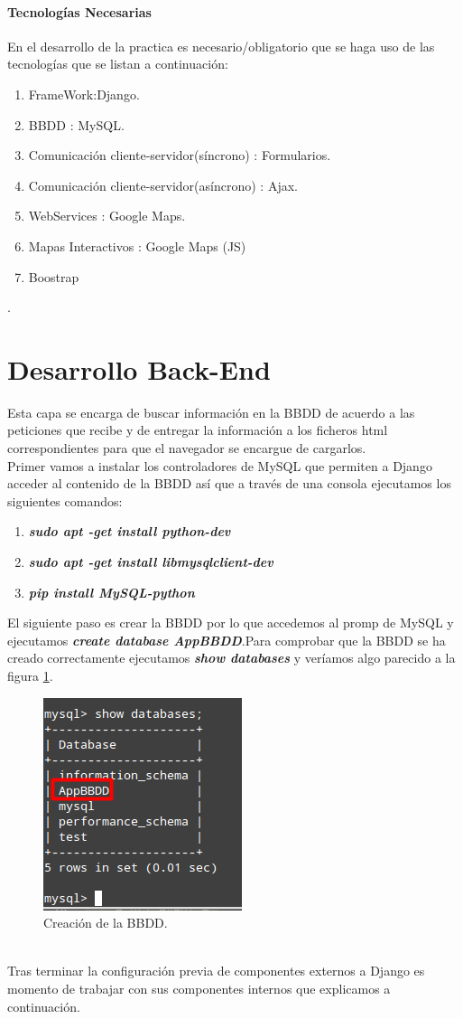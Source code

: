 \paragraph{Tecnologías Necesarias}
En el desarrollo de la practica es necesario/obligatorio que se haga uso de las tecnologías que se listan a continuación:
\begin{enumerate}
\item FrameWork:Django.
\item BBDD : MySQL.
\item Comunicación cliente-servidor(síncrono) : Formularios.
\item Comunicación cliente-servidor(asíncrono) : Ajax.
\item WebServices : Google Maps.
\item Mapas Interactivos : Google Maps (JS)
\item Boostrap
\end{enumerate}.
\section{Desarrollo Back-End}
Esta capa se encarga de buscar información en la BBDD de acuerdo a las peticiones que recibe y de entregar la información a los ficheros html correspondientes para que el navegador se encargue de cargarlos.
\\Primer vamos a instalar los controladores de MySQL que permiten a Django acceder al contenido de la BBDD así que a través de una consola ejecutamos los siguientes comandos:
\begin{enumerate}
\item \textbf{\textit{sudo apt -get install python-dev}}
\item \textbf{\textit{sudo apt -get install libmysqlclient-dev}}
\item \textbf{\textit{pip install MySQL-python}}
\end{enumerate}
El siguiente paso es crear la BBDD por lo que accedemos al promp de MySQL y ejecutamos \textit{\textbf{create database AppBBDD}}.Para comprobar que la BBDD se ha creado correctamente ejecutamos \textbf{\textit{show databases}} y veríamos algo parecido a la figura \ref{fig:Creacion_BBDD_APP}.
\begin{figure}[!h]
\begin{center}
   \includegraphics[width=0.2\linewidth]{Figures/Create_Databases}
  \decoRule
  \caption[Create BBDD]{Creación de la BBDD.}
\label{fig:Creacion_BBDD_APP}
\end{center}
\end{figure}
\\Tras terminar la configuración previa de componentes externos a Django es momento de trabajar con sus componentes internos que explicamos a continuación.
